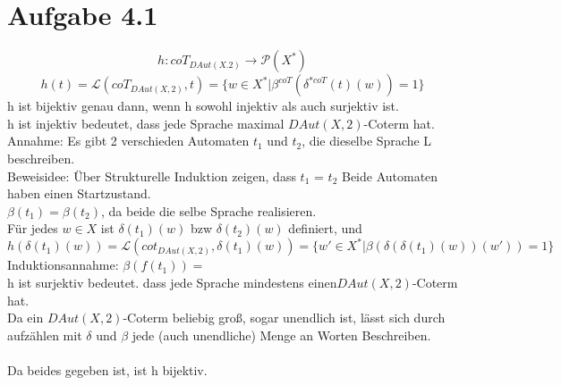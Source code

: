 \section*{Aufgabe 4.1}
\[h:coT_{DAut(X.2)}\rightarrow\mathcal{P}(X^*)\]
\[ h(t)=\mathcal{L}(coT_{DAut(X,2)},t)=\{w\in X^*|\beta^{coT}(\delta^{*coT}(t)(w))=1\}\]
h ist bijektiv genau dann, wenn h sowohl injektiv als auch surjektiv ist.\\
h ist injektiv bedeutet, dass jede Sprache maximal $DAut(X,2)$-Coterm hat.\\
Annahme: Es gibt 2 verschieden Automaten $t_1$ und $t_2$, die dieselbe Sprache L beschreiben.\\
Beweisidee: Über Strukturelle Induktion zeigen, dass $t_1$ = $t_2$
Beide  Automaten haben einen Startzustand.\\
$\beta(t_1)=\beta(t_2)$, da beide die selbe Sprache realisieren.\\
Für jedes $w\in X$ ist $\delta(t_1)(w)$ bzw $\delta(t_2)(w)$ definiert, und $h(\delta(t_1)(w))=\mathcal{L}(cot_{DAut(X,2)},\delta(t_1)(w))=\{w'\in X^*|\beta(\delta(\delta(t_1)(w))(w')) = 1 \}$\\
Induktionsannahme: $\beta(f(t_1))=$\\
h ist surjektiv bedeutet. dass jede Sprache mindestens einen$DAut(X,2)$-Coterm hat.\\
Da ein $DAut(X,2)$-Coterm beliebig groß, sogar unendlich ist, lässt sich durch aufzählen mit $\delta$ und $\beta$ jede (auch unendliche) Menge an Worten Beschreiben.\\
\\
Da beides gegeben ist, ist h bijektiv.
